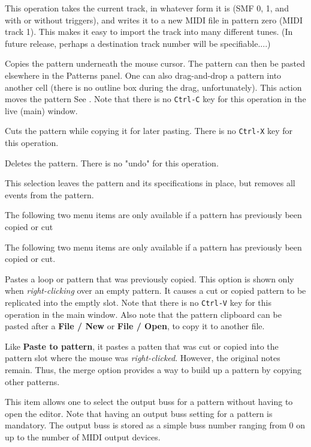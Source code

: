    This operation takes the current track, in whatever form it is (SMF 0, 1,
   and with or without triggers), and writes it to a new
   MIDI file in pattern zero (MIDI track 1).
   This makes it easy to import the track into many different tunes.
   (In future release, perhaps a destination track number will be
   specifiable....)

   Copies the pattern underneath the mouse cursor.
   The pattern can then be pasted elsewhere in the Patterns panel.
   One can also drag-and-drop a pattern into another cell (there is no outline
   box during the drag, unfortunately).
   This action moves the pattern
   See .
   Note that there is no \texttt{Ctrl-C} key for this operation in the
   live (main) window.

   Cuts the pattern while copying it for later pasting.
   There is no \texttt{Ctrl-X} key for this operation.

   Deletes the pattern.
   There is no "undo" for this operation.

   This selection leaves the pattern and its specifications in place,
   but removes all events from the pattern.

   The following two menu items are only available if a pattern
   has previously been copied or cut

   The following two menu items are only available if a pattern
   has previously been copied or cut.

   Pastes a loop or pattern that was previously copied.
   This option is shown only when
   \textsl{right-clicking} over an empty pattern.
   It causes a cut or copied pattern to be replicated into the emptly slot.
   Note that there is no \texttt{Ctrl-V} key for this operation in the
   main window.
   Also note that the pattern clipboard can be pasted after a
   \textbf{File / New} or \textbf{File / Open},
   to copy it to another file.

   Like \textbf{Paste to pattern}, it pastes a
   patten that was cut or copied into the pattern slot where the mouse was
   \textsl{right-clicked}.  However, the original notes remain.  Thus, the merge
   option provides a way to build up a pattern by copying other patterns.

   This item allows one to select the output buss for a pattern without having
   to open the editor.
   Note that having an output buss setting for a pattern is mandatory.
   The output buss is stored as a simple buss number ranging from 0 on up to
   the number of MIDI output devices.

